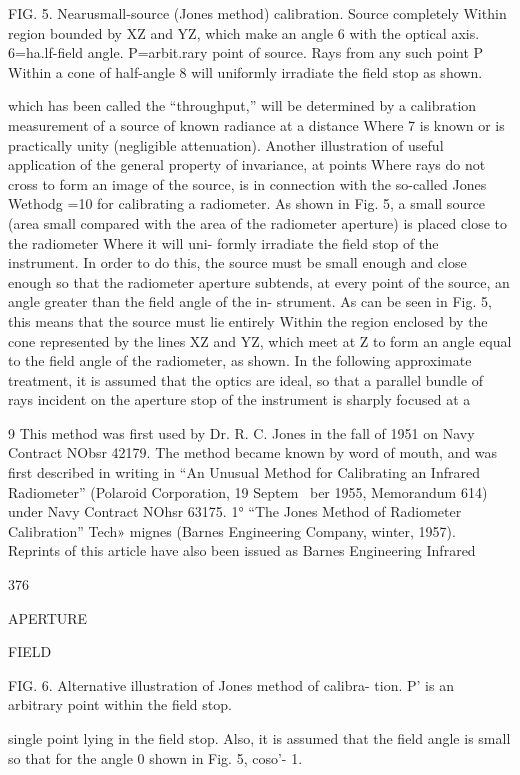\begin{refsection}
FIG. 5. Nearusmall-source (Jones method) calibration.
Source completely Within region bounded by XZ and YZ,
which make an angle 6 with the optical axis. 6=ha.lf-field
angle. P=arbit.rary point of source. Rays from any such
point P Within a cone of half-angle 8 will uniformly irradiate
the field stop as shown.

which has been called the “throughput,” will be
determined by a calibration measurement of a
source of known radiance at a distance Where 7
is known or is practically unity (negligible
attenuation).
Another illustration of useful application of
the general property of invariance, at points
Where rays do not cross to form an image of the
source, is in connection with the so-called Jones
Wethodg =10 for calibrating a radiometer. As shown
in Fig. 5, a small source (area small compared
with the area of the radiometer aperture) is
placed close to the radiometer Where it will uni-
formly irradiate the field stop of the instrument.
In order to do this, the source must be small
enough and close enough so that the radiometer
aperture subtends, at every point of the source,
an angle greater than the field angle of the in-
strument. As can be seen in Fig. 5, this means
that the source must lie entirely Within the region
enclosed by the cone represented by the lines
XZ and YZ, which meet at Z to form an angle
equal to the field angle of the radiometer, as
shown.
In the following approximate treatment, it is
assumed that the optics are ideal, so that a
parallel bundle of rays incident on the aperture
stop of the instrument is sharply focused at a

9 This method was first used by Dr. R. C. Jones in the
fall of 1951 on Navy Contract NObsr 42179. The method
became known by word of mouth, and was first described
in writing in “An Unusual Method for Calibrating an
Infrared Radiometer” (Polaroid Corporation, 19 Septem~
ber 1955, Memorandum 614) under Navy Contract
NOhsr 63175.
1° “The Jones Method of Radiometer Calibration” Tech»
mignes (Barnes Engineering Company, winter, 1957).
Reprints of this article have also been issued as Barnes
Engineering Infrared


376

APERTURE

FIELD

FIG. 6. Alternative illustration of Jones method of calibra-
tion. P’ is an arbitrary point within the field stop.

single point lying in the field stop. Also, it is
assumed that the field angle is small so that for
the angle 0 shown in Fig. 5, coso'- 1.


\end{refsection}
